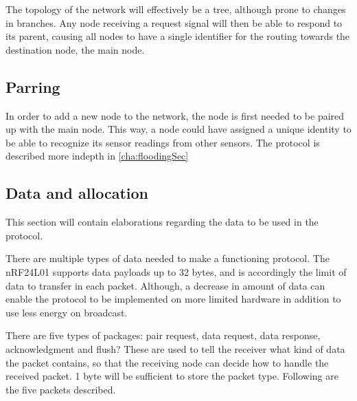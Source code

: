The topology of the network will effectively be a tree, although prone to changes in branches.
Any node receiving a request signal will then be able to respond to its parent, causing all nodes to have a single identifier for the routing towards the destination node, the main node.

\subsection{Parring}
In order to add a new node to the network, the node is first needed to be paired up with the main node.
This way, a node could have assigned a unique identity to be able to recognize its sensor readings from other sensors. 
The protocol is described more indepth in \ref{cha:floodingSec}




\subsection{Data and allocation}
This section will contain elaborations regarding the data to be used in the protocol.

There are multiple types of data needed to make a functioning protocol. The nRF24L01 supports data payloads up to 32 bytes, and is accordingly the limit of data to transfer in each packet.
Although, a decrease in amount of data can enable the protocol to be implemented on more limited hardware in addition to use less energy on broadcast.

There are five types of packages: pair request, data request, data response, acknowledgment and flush?
These are used to tell the receiver what kind of data the packet contains, so that the receiving node can decide how to handle the received packet. 1 byte will be sufficient to store the packet type.
Following are the five  packets described.

